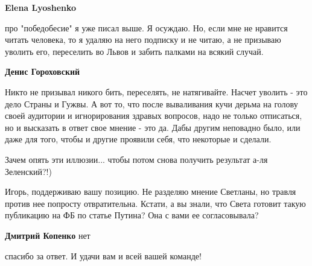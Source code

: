 \begin{itemize}
\begin{itemize}
\textbf{Elena Lyoshenko} 

про "победобесие" я уже писал выше. Я осуждаю. Но, если мне не нравится читать
человека, то я удаляю на него подписку и не читаю, а не призываю уволить его,
переселить во Львов и забить палками на всякий случай.


 

\textbf{Денис Гороховский}

Никто не призывал никого бить, переселять, не натягивайте. Насчет уволить - это
дело Страны и Гужвы. А вот то, что после вываливания кучи дерьма на голову
своей аудитории и игнорирования здравых вопросов, надо не только отписаться, но
и высказать в ответ свое мнение - это да. Дабы другим неповадно было, или даже
для того, чтобы и другие проявили себя, что некоторые и сделали.

Зачем опять эти иллюзии... чтобы потом снова получить результат а-ля Зеленский?!)

\end{itemize}

 

Игорь, поддерживаю вашу позицию. Не разделяю мнение Светланы, но травля против
нее попросту отвратительна. Кстати, а вы знали, что Света готовит такую
публикацию на ФБ по статье Путина? Она с вами ее согласовывала?

\begin{itemize}
 
\textbf{Дмитрий Копенко} нет

 
спасибо за ответ. И удачи вам и всей вашей команде!
\end{itemize}

\end{itemize}

